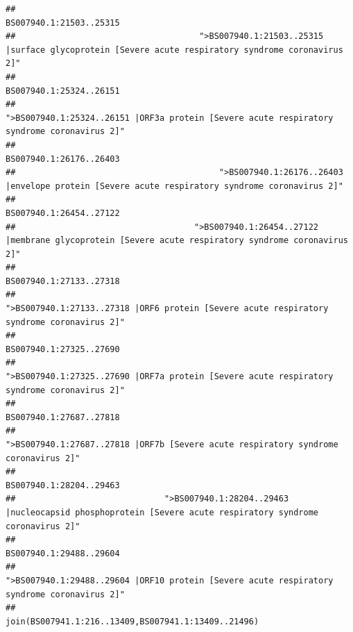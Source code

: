 \documentclass[
]{article}
\begin{document}
\begin{verbatim}
##                                                                                                                BS007940.1:21503..25315 
##                                     ">BS007940.1:21503..25315 |surface glycoprotein [Severe acute respiratory syndrome coronavirus 2]" 
##                                                                                                                BS007940.1:25324..26151 
##                                            ">BS007940.1:25324..26151 |ORF3a protein [Severe acute respiratory syndrome coronavirus 2]" 
##                                                                                                                BS007940.1:26176..26403 
##                                         ">BS007940.1:26176..26403 |envelope protein [Severe acute respiratory syndrome coronavirus 2]" 
##                                                                                                                BS007940.1:26454..27122 
##                                    ">BS007940.1:26454..27122 |membrane glycoprotein [Severe acute respiratory syndrome coronavirus 2]" 
##                                                                                                                BS007940.1:27133..27318 
##                                             ">BS007940.1:27133..27318 |ORF6 protein [Severe acute respiratory syndrome coronavirus 2]" 
##                                                                                                                BS007940.1:27325..27690 
##                                            ">BS007940.1:27325..27690 |ORF7a protein [Severe acute respiratory syndrome coronavirus 2]" 
##                                                                                                                BS007940.1:27687..27818 
##                                                    ">BS007940.1:27687..27818 |ORF7b [Severe acute respiratory syndrome coronavirus 2]" 
##                                                                                                                BS007940.1:28204..29463 
##                              ">BS007940.1:28204..29463 |nucleocapsid phosphoprotein [Severe acute respiratory syndrome coronavirus 2]" 
##                                                                                                                BS007940.1:29488..29604 
##                                            ">BS007940.1:29488..29604 |ORF10 protein [Severe acute respiratory syndrome coronavirus 2]" 
##                                                                                    join(BS007941.1:216..13409,BS007941.1:13409..21496) 

\end{verbatim}
\end{document}
